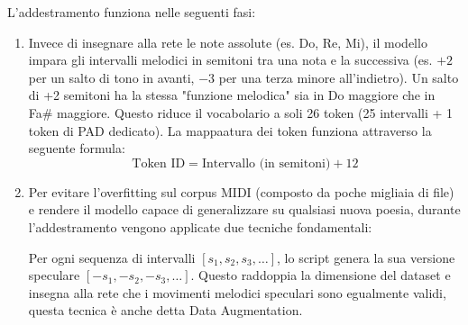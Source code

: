 L'addestramento funziona nelle seguenti fasi:
\begin{enumerate}
    \item Invece di insegnare alla rete le note assolute (es. Do, Re, Mi), il modello impara gli intervalli melodici in semitoni tra una nota e la successiva (es. $+2$ per un salto di tono in avanti, $-3$ per una terza minore all'indietro).
    Un salto di +2 semitoni ha la stessa "funzione melodica" sia in Do maggiore che in Fa\# maggiore. Questo riduce il vocabolario a soli 26 token (25 intervalli + 1 token di PAD dedicato).
    La mappaatura dei token funziona attraverso la seguente formula:
    \[
    \text{Token ID} = \text{Intervallo (in semitoni)}+12
    \]
    \item Per evitare l'overfitting sul corpus MIDI (composto da poche migliaia di file) e rendere il modello capace di generalizzare su qualsiasi nuova poesia, durante l'addestramento vengono applicate due tecniche fondamentali:

    Per ogni sequenza di intervalli $[s_1, s_2, s_3, \dots]$, lo script genera la sua versione speculare $[-s_1, -s_2, -s_3, \dots]$. Questo raddoppia la dimensione del dataset e insegna alla rete che i movimenti melodici speculari sono egualmente validi, questa tecnica è anche detta Data Augmentation.


\end{enumerate}
